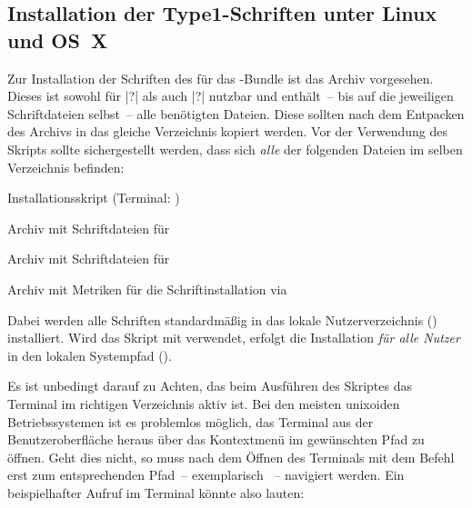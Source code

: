 \subsection{Installation der Type1-Schriften unter Linux und OS~X}
%
%
Zur Installation der Schriften des \CDs für das \TUDScript-Bundle ist das Archiv
%
{}
 vorgesehen. Dieses ist sowohl für |?| als auch 
|?| nutzbar und enthält~-- bis auf die jeweiligen 
Schriftdateien selbst~-- alle benötigten Dateien. Diese sollten nach dem 
Entpacken des Archivs in das gleiche Verzeichnis kopiert werden. Vor der 
Verwendung des Skripts  sollte sichergestellt 
werden, dass sich \emph{alle} der folgenden Dateien im selben Verzeichnis 
befinden:
%
\begin{description}[labelwidth=\tempdim,labelsep=1em]
  \item[\File{tudscr\_fonts\_install.sh}]Installationsskript
    (Terminal: )
  \item[\File{Univers\_PS.zip}]Archiv mit Schriftdateien für \Univers
  \item[\File{DIN\_Bd\_PS.zip}]Archiv mit Schriftdateien für \DIN
  \item[\File{tudscr\_fonts\_install.zip}]Archiv mit Metriken für die
    Schriftinstallation via 
\end{description}
%
Dabei werden alle Schriften standardmäßig in das lokale Nutzerverzeichnis 
() installiert. Wird das Skript mit  verwendet, 
erfolgt die Installation \emph{für alle Nutzer} in den lokalen Systempfad 
().

Es ist unbedingt darauf zu Achten, das beim Ausführen des Skriptes das Terminal 
im richtigen Verzeichnis aktiv ist. Bei den meisten unixoiden Betriebssystemen 
ist es problemlos möglich, das Terminal aus der Benutzeroberfläche heraus über 
das Kontextmenü im gewünschten Pfad zu öffnen. Geht dies nicht, so muss nach 
dem Öffnen des Terminals mit dem Befehl  erst zum entsprechenden 
Pfad~-- exemplarisch ~-- 
navigiert werden. Ein beispielhafter Aufruf im Terminal könnte also lauten:
%
\begin{quoting}
\newline
{}
\end{quoting}



